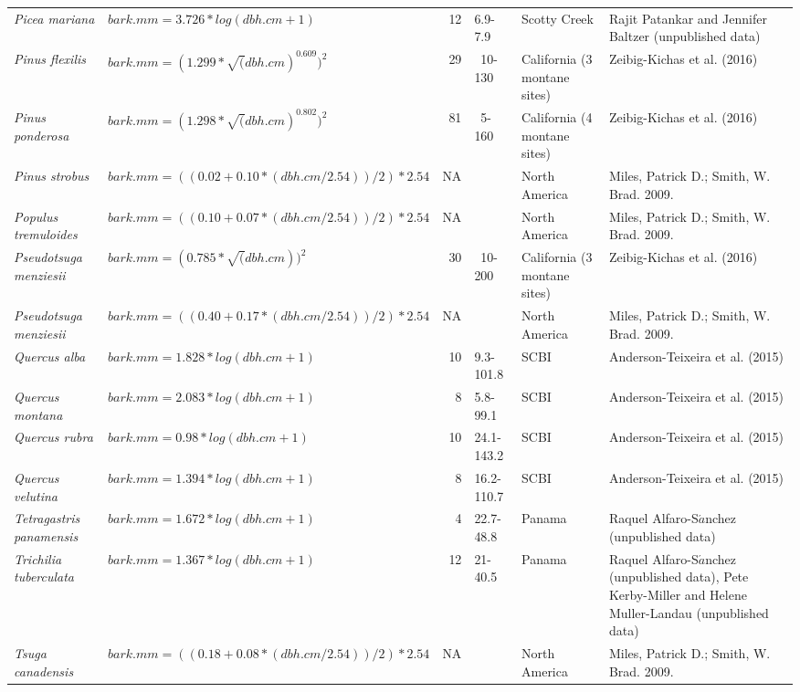 \documentclass[
]{article}
\begin{document}
\begin{table}[!h]
{\begin{tabular}{>{}llrl>{\raggedright\arraybackslash}p{3cm}>{\raggedright\arraybackslash}p{6cm}}
\addlinespace
\em{Picea mariana} & $bark.mm = 3.726 * log(dbh.cm + 1)$ & 12 & 6.9-7.9 & Scotty Creek & Rajit Patankar and Jennifer Baltzer (unpublished data)\\
\addlinespace
\em{Pinus flexilis} & $bark.mm = (1.299*\sqrt(dbh.cm)^{0.609})^{2}$ & 29 & ~10-130 & California (3 montane sites) & Zeibig-Kichas et al. (2016)\\
\addlinespace
\em{Pinus ponderosa} & $bark.mm = (1.298*\sqrt(dbh.cm)^{0.802})^{2}$ & 81 & ~5-160 & California (4 montane sites) & Zeibig-Kichas et al. (2016)\\
\addlinespace
\em{Pinus strobus} & $bark.mm = ((0.02 + 0.10 *  (dbh.cm/2.54))/2)*2.54$ & NA &  & North America & Miles, Patrick D.; Smith, W. Brad. 2009.\\
\addlinespace
\em{Populus tremuloides} & $bark.mm = ((0.10 + 0.07 *  (dbh.cm/2.54))/2)*2.54$ & NA &  & North America & Miles, Patrick D.; Smith, W. Brad. 2009.\\
\addlinespace
\em{Pseudotsuga menziesii} & $bark.mm = (0.785*\sqrt(dbh.cm))^{2}$ & 30 & ~10-200 & California (3 montane sites) & Zeibig-Kichas et al. (2016)\\
\addlinespace
\em{Pseudotsuga menziesii} & $bark.mm = ((0.40 + 0.17 *  (dbh.cm/2.54))/2)*2.54$ & NA &  & North America & Miles, Patrick D.; Smith, W. Brad. 2009.\\
\addlinespace
\em{Quercus alba} & $bark.mm = 1.828 * log(dbh.cm + 1)$ & 10 & 9.3-101.8 & SCBI & Anderson-Teixeira et al. (2015)\\
\addlinespace
\em{Quercus montana} & $bark.mm = 2.083 * log(dbh.cm + 1)$ & 8 & 5.8-99.1 & SCBI & Anderson-Teixeira et al. (2015)\\
\addlinespace
\em{Quercus rubra} & $bark.mm = 0.98 * log(dbh.cm + 1)$ & 10 & 24.1-143.2 & SCBI & Anderson-Teixeira et al. (2015)\\
\addlinespace
\em{Quercus velutina} & $bark.mm = 1.394 * log(dbh.cm + 1)$ & 8 & 16.2-110.7 & SCBI & Anderson-Teixeira et al. (2015)\\
\addlinespace
\em{Tetragastris panamensis} & $bark.mm = 1.672 * log(dbh.cm + 1)$ & 4 & 22.7-48.8 & Panama & Raquel Alfaro-S$\acute{a}$nchez (unpublished data)\\
\addlinespace
\em{Trichilia tuberculata} & $bark.mm = 1.367 * log(dbh.cm + 1)$ & 12 & 21-40.5 & Panama & Raquel Alfaro-S$\acute{a}$nchez (unpublished data), Pete Kerby-Miller and Helene Muller-Landau (unpublished data)\\
\addlinespace
\em{Tsuga canadensis} & $bark.mm = ((0.18 + 0.08 *  (dbh.cm/2.54))/2)*2.54$ & NA &  & North America & Miles, Patrick D.; Smith, W. Brad. 2009.\\
\bottomrule
\end{tabular}}
\end{table}
\end{document}

